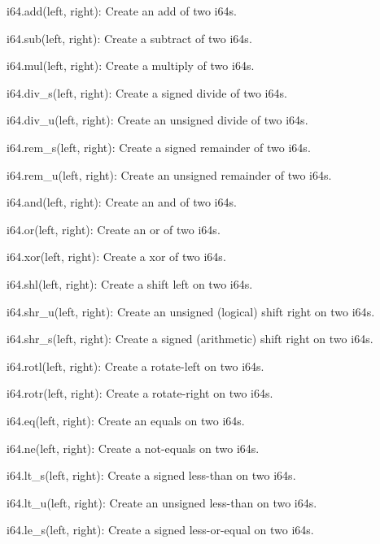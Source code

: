 \begin{DoxyItemize}
\begin{DoxyItemize}
\item {\ttfamily i64.\+add(left, right)}\+: Create an add of two {\ttfamily i64}s.
\item {\ttfamily i64.\+sub(left, right)}\+: Create a subtract of two {\ttfamily i64}s.
\item {\ttfamily i64.\+mul(left, right)}\+: Create a multiply of two {\ttfamily i64}s.
\item {\ttfamily i64.\+div\+\_\+s(left, right)}\+: Create a signed divide of two {\ttfamily i64}s.
\item {\ttfamily i64.\+div\+\_\+u(left, right)}\+: Create an unsigned divide of two {\ttfamily i64}s.
\item {\ttfamily i64.\+rem\+\_\+s(left, right)}\+: Create a signed remainder of two {\ttfamily i64}s.
\item {\ttfamily i64.\+rem\+\_\+u(left, right)}\+: Create an unsigned remainder of two {\ttfamily i64}s.
\item {\ttfamily i64.\+and(left, right)}\+: Create an and of two {\ttfamily i64}s.
\item {\ttfamily i64.\+or(left, right)}\+: Create an or of two {\ttfamily i64}s.
\item {\ttfamily i64.\+xor(left, right)}\+: Create a xor of two {\ttfamily i64}s.
\item {\ttfamily i64.\+shl(left, right)}\+: Create a shift left on two {\ttfamily i64}s.
\item {\ttfamily i64.\+shr\+\_\+u(left, right)}\+: Create an unsigned (logical) shift right on two {\ttfamily i64}s.
\item {\ttfamily i64.\+shr\+\_\+s(left, right)}\+: Create a signed (arithmetic) shift right on two {\ttfamily i64}s.
\item {\ttfamily i64.\+rotl(left, right)}\+: Create a rotate-\/left on two {\ttfamily i64}s.
\item {\ttfamily i64.\+rotr(left, right)}\+: Create a rotate-\/right on two {\ttfamily i64}s.
\item {\ttfamily i64.\+eq(left, right)}\+: Create an equals on two {\ttfamily i64}s.
\item {\ttfamily i64.\+ne(left, right)}\+: Create a not-\/equals on two {\ttfamily i64}s.
\item {\ttfamily i64.\+lt\+\_\+s(left, right)}\+: Create a signed less-\/than on two {\ttfamily i64}s.
\item {\ttfamily i64.\+lt\+\_\+u(left, right)}\+: Create an unsigned less-\/than on two {\ttfamily i64}s.
\item {\ttfamily i64.\+le\+\_\+s(left, right)}\+: Create a signed less-\/or-\/equal on two {\ttfamily i64}s.

\end{DoxyItemize}
\end{DoxyItemize}

